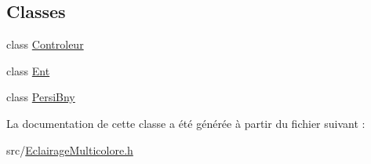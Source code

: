 \subsection*{Classes}
\begin{DoxyCompactItemize}
\item 
class \hyperlink{classEclairageMulticolore_1_1Controleur}{Controleur}
\item 
class \hyperlink{classEclairageMulticolore_1_1Ent}{Ent}
\item 
class \hyperlink{classEclairageMulticolore_1_1PersiBny}{Persi\+Bny}
\end{DoxyCompactItemize}


La documentation de cette classe a été générée à partir du fichier suivant \+:\begin{DoxyCompactItemize}
\item 
src/\hyperlink{EclairageMulticolore_8h}{Eclairage\+Multicolore.\+h}\end{DoxyCompactItemize}
